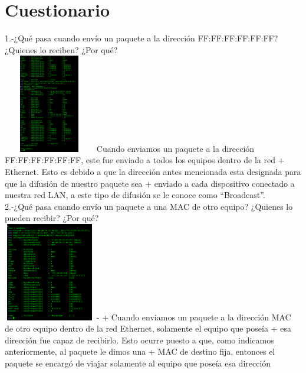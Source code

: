 \documentclass{udpreport}
\begin{document}
	\section{Cuestionario}
	
	  1.-¿Qué pasa cuando envío un paquete a la dirección FF:FF:FF:FF:FF:FF? ¿Quienes
	     lo reciben? ¿Por qué?\\
    			\includegraphics[width=4cm, height=4.3cm]{EnvioPaquetito.png}  
	     Cuando enviamos un paquete a la dirección FF:FF:FF:FF:FF:FF, este fue enviado a todos los equipos dentro de la red
 +	     Ethernet. Esto es debido a que la dirección antes mencionada esta designada para que la difusión de nuestro paquete sea
 +	     enviado a cada dispositivo conectado a nuestra red LAN, a este tipo de difusión se le conoce como “Broadcast”.\\
 
  	  2.-¿Qué pasa cuando envío un paquete a una MAC de otro equipo? ¿Quienes lo
  	      pueden recibir? ¿Por qué?\\
    			\includegraphics[width=4cm, height=4.3cm]{EnvioPaquetitoMalo2.png}
 -	      
 +	      Cuando enviamos un paquete a la dirección MAC de otro equipo dentro de la red Ethernet, solamente el equipo que poseía
 +	      esa dirección fue capaz de recibirlo. Esto ocurre puesto a que, como indicamos anteriormente, al paquete le dimos una
 +	      MAC de destino fija, entonces el paquete se encargó de viajar solamente al equipo que poseía esa dirección\\
 
\end{document}
